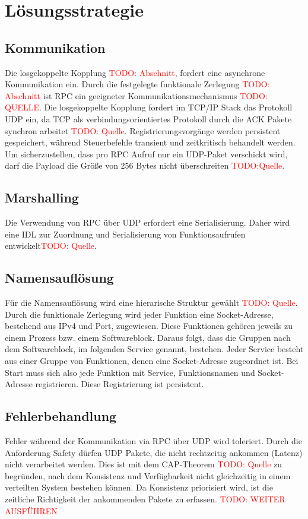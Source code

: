 \chapter{Lösungsstrategie}


\section*{Kommunikation}
Die losgekoppelte Kopplung \textcolor{red}{TODO: Abschnitt}, fordert eine asynchrone Kommunikation ein. 
Durch die festgelegte funktionale Zerlegung \textcolor{red}{TODO: Abschnitt} ist RPC ein geeigneter Kommunikationsmechanismus \textcolor{red}{TODO: QUELLE}. Die losgekoppelte Kopplung fordert im TCP/IP Stack das Protokoll UDP ein, da TCP als verbindungsorientiertes Protokoll durch die ACK Pakete synchron arbeitet \textcolor{red}{TODO: Quelle}.	 Registrierungsvorgänge werden persistent gespeichert, während Steuerbefehle transient und zeitkritisch behandelt werden. Um sicherzustellen, dass pro RPC Aufruf nur ein UDP-Paket verschickt wird, darf die Payload die Größe von 256 Bytes nicht überschreiten \textcolor{red}{TODO:Quelle}.
	
\section*{Marshalling}
Die Verwendung von RPC über UDP erfordert eine Serialisierung.
Daher wird eine IDL zur Zuordnung und Serialisierung von Funktionsaufrufen entwickelt\textcolor{red}{TODO: Quelle}.
	
\section*{Namensauflösung}
Für die Namensauflösung wird eine hierarische Struktur gewählt \textcolor{red}{TODO: Quelle}. Durch die funktionale Zerlegung wird jeder Funktion eine Socket-Adresse, bestehend aus IPv4 und Port, zugewiesen. Diese Funktionen gehören jeweils zu einem Prozess bzw. einem Softwareblock. Daraus folgt, dass die Gruppen nach dem Softwareblock, im folgenden Service genannt, bestehen. Jeder Service besteht aus einer Gruppe von Funktionen, denen eine Socket-Adresse zugeordnet ist. Bei Start muss sich also jede Funktion mit Service, Funktionsnamen und Socket-Adresse registrieren. Diese Registrierung ist persistent.

\section*{Fehlerbehandlung}
Fehler während der Kommunikation via RPC über UDP wird toleriert. Durch die Anforderung Safety dürfen UDP Pakete, die nicht rechtzeitig ankommen (Latenz) nicht verarbeitet werden. Dies ist mit dem CAP-Theorem \textcolor{red}{TODO: Quelle} zu begründen, nach dem Konsistenz und Verfügbarkeit nicht gleichzeitig in einem verteilten System bestehen können. Da Konsistenz priorisiert wird, ist die zeitliche Richtigkeit der ankommenden Pakete zu erfassen. 
\textcolor{red}{TODO: WEITER AUSFÜHREN}

